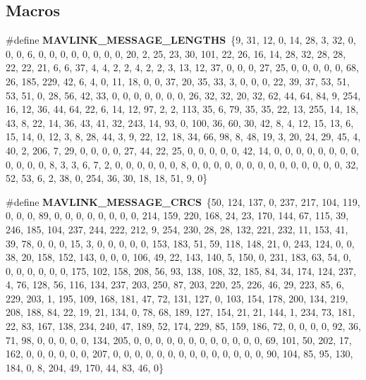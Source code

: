 \subsection*{Macros}
\begin{DoxyCompactItemize}
\item 
\#define \textbf{ M\+A\+V\+L\+I\+N\+K\+\_\+\+M\+E\+S\+S\+A\+G\+E\+\_\+\+L\+E\+N\+G\+T\+HS}~\{9, 31, 12, 0, 14, 28, 3, 32, 0, 0, 0, 6, 0, 0, 0, 0, 0, 0, 0, 0, 20, 2, 25, 23, 30, 101, 22, 26, 16, 14, 28, 32, 28, 28, 22, 22, 21, 6, 6, 37, 4, 4, 2, 2, 4, 2, 2, 3, 13, 12, 37, 0, 0, 0, 27, 25, 0, 0, 0, 0, 0, 68, 26, 185, 229, 42, 6, 4, 0, 11, 18, 0, 0, 37, 20, 35, 33, 3, 0, 0, 0, 22, 39, 37, 53, 51, 53, 51, 0, 28, 56, 42, 33, 0, 0, 0, 0, 0, 0, 0, 26, 32, 32, 20, 32, 62, 44, 64, 84, 9, 254, 16, 12, 36, 44, 64, 22, 6, 14, 12, 97, 2, 2, 113, 35, 6, 79, 35, 35, 22, 13, 255, 14, 18, 43, 8, 22, 14, 36, 43, 41, 32, 243, 14, 93, 0, 100, 36, 60, 30, 42, 8, 4, 12, 15, 13, 6, 15, 14, 0, 12, 3, 8, 28, 44, 3, 9, 22, 12, 18, 34, 66, 98, 8, 48, 19, 3, 20, 24, 29, 45, 4, 40, 2, 206, 7, 29, 0, 0, 0, 0, 27, 44, 22, 25, 0, 0, 0, 0, 0, 42, 14, 0, 0, 0, 0, 0, 0, 0, 0, 0, 0, 0, 0, 8, 3, 3, 6, 7, 2, 0, 0, 0, 0, 0, 0, 8, 0, 0, 0, 0, 0, 0, 0, 0, 0, 0, 0, 0, 0, 0, 32, 52, 53, 6, 2, 38, 0, 254, 36, 30, 18, 18, 51, 9, 0\}
\item 
\#define \textbf{ M\+A\+V\+L\+I\+N\+K\+\_\+\+M\+E\+S\+S\+A\+G\+E\+\_\+\+C\+R\+CS}~\{50, 124, 137, 0, 237, 217, 104, 119, 0, 0, 0, 89, 0, 0, 0, 0, 0, 0, 0, 0, 214, 159, 220, 168, 24, 23, 170, 144, 67, 115, 39, 246, 185, 104, 237, 244, 222, 212, 9, 254, 230, 28, 28, 132, 221, 232, 11, 153, 41, 39, 78, 0, 0, 0, 15, 3, 0, 0, 0, 0, 0, 153, 183, 51, 59, 118, 148, 21, 0, 243, 124, 0, 0, 38, 20, 158, 152, 143, 0, 0, 0, 106, 49, 22, 143, 140, 5, 150, 0, 231, 183, 63, 54, 0, 0, 0, 0, 0, 0, 0, 175, 102, 158, 208, 56, 93, 138, 108, 32, 185, 84, 34, 174, 124, 237, 4, 76, 128, 56, 116, 134, 237, 203, 250, 87, 203, 220, 25, 226, 46, 29, 223, 85, 6, 229, 203, 1, 195, 109, 168, 181, 47, 72, 131, 127, 0, 103, 154, 178, 200, 134, 219, 208, 188, 84, 22, 19, 21, 134, 0, 78, 68, 189, 127, 154, 21, 21, 144, 1, 234, 73, 181, 22, 83, 167, 138, 234, 240, 47, 189, 52, 174, 229, 85, 159, 186, 72, 0, 0, 0, 0, 92, 36, 71, 98, 0, 0, 0, 0, 0, 134, 205, 0, 0, 0, 0, 0, 0, 0, 0, 0, 0, 0, 0, 69, 101, 50, 202, 17, 162, 0, 0, 0, 0, 0, 0, 207, 0, 0, 0, 0, 0, 0, 0, 0, 0, 0, 0, 0, 0, 0, 90, 104, 85, 95, 130, 184, 0, 8, 204, 49, 170, 44, 83, 46, 0\}
\item 

\end{DoxyCompactItemize}
